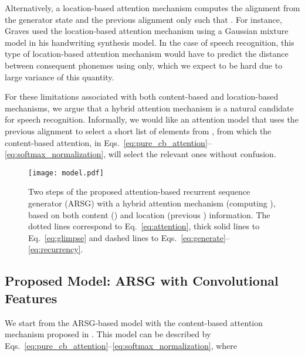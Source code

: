 \documentclass{article}
\begin{document}
Alternatively, a location-based attention mechanism computes the alignment from
the generator state and the previous alignment only such that
. 
For instance, Graves \cite{graves_generating_2013} used the location-based
attention mechanism using a Gaussian mixture model in his handwriting synthesis
model.  In the case of speech recognition, this type of location-based attention
mechanism would have to predict the distance between consequent 
phonemes using  only, which we expect to be hard due to
large variance of this quantity.

For these limitations associated with both content-based and location-based
mechanisms, we argue that a hybrid attention mechanism is a natural candidate
for speech recognition. Informally, we would like an attention model that uses
the previous alignment  to select a short list of elements from
, from which the content-based attention, in
Eqs.~\eqref{eq:pure_cb_attention}--\eqref{eq:softmax_normalization}, will select
the relevant ones without confusion.

\begin{figure}
    \centering
\hfill
    \begin{minipage}{0.6\textwidth}
        \centering
        \texttt{[image: model.pdf]}
    \end{minipage}
    \begin{minipage}{0.38\textwidth}
        \caption{
            Two steps of the proposed attention-based recurrent sequence
            generator (ARSG) with a hybrid attention mechanism (computing ), based on
            both content () and location (previous ) information.
            The dotted lines correspond to Eq.~\eqref{eq:attention}, thick solid
            lines to Eq.~\eqref{eq:glimpse} and dashed lines to
            Eqs.~\eqref{eq:generate}--\eqref{eq:recurrency}.
        }
        \label{fig:model}
    \end{minipage}
    \hfill


  \vspace{-4mm}
\end{figure}    

\subsection{Proposed Model: ARSG with Convolutional Features}

We start from the ARSG-based model with the content-based attention mechanism
proposed in \cite{bahdanau_neural_2014}. This model can be described by
Eqs.~\eqref{eq:pure_cb_attention}--\eqref{eq:softmax_normalization}, where 
\end{document}
